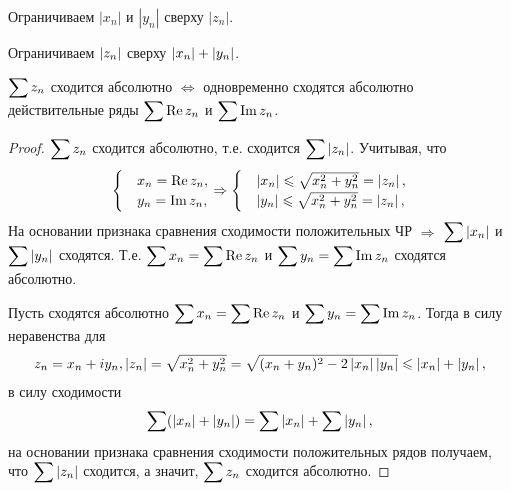\begin{plan}
\item \circled{$\Rightarrow$} Ограничиваем $|x_n|$ и $|y_n|$ сверху $|z_n|$.
\item \circled{$\Leftarrow$} Ограничиваем $\left\lvert z_n \right\rvert$ сверху $\left\lvert x_n \right\rvert + \left\lvert y_n \right\rvert$.
\end{plan}

\begin{col-answer-preambule}
\end{col-answer-preambule}
\begin{theorem}
  $\displaystyle\sum z_n$ сходится абсолютно $\Leftrightarrow$ одновременно сходятся абсолютно действительные ряды
$\displaystyle\sum \operatorname{Re}z_n$ и $\displaystyle\sum \operatorname{Im}z_n$.
\end{theorem}
\begin{proof}
  \circled{$\Rightarrow$} $\displaystyle\sum z_n$ сходится абсолютно, т.е. сходится $\displaystyle\sum \left\lvert z_n \right\rvert$. Учитывая,
  что
  \begin{align*}
    \begin{cases}
      &x_n = \operatorname{Re}z_n,\\
      &y_n = \operatorname{Im}z_n,\\
    \end{cases} \Rightarrow
    \begin{cases}
      &\left\lvert x_n \right\rvert \leqslant \sqrt{x_n^2 + y_n^2} = \left\lvert z_n \right\rvert,\\
      &\left\lvert y_n \right\rvert \leqslant \sqrt{x_n^2 + y_n^2} = \left\lvert z_n \right\rvert,\\
    \end{cases}
  \end{align*}
  На основании признака сравнения сходимости положительных ЧР $\Rightarrow$ $\displaystyle\sum\left\lvert x_n \right\rvert$ и $\displaystyle\sum\left\lvert y_n \right\rvert$
  сходятся. Т.е. ${\displaystyle\sum x_n = \displaystyle\sum \operatorname{Re}z_n}$ и
  ${\displaystyle\sum y_n = \displaystyle\sum \operatorname{Im}z_n}$
  сходятся абсолютно.

  \circled{$\Leftarrow$} Пусть сходятся абсолютно ${\displaystyle\sum x_n = \displaystyle\sum \operatorname{Re}z_n}$ и
  ${\displaystyle\sum y_n = \displaystyle\sum \operatorname{Im}z_n}$. Тогда в силу неравенства для
  \begin{align*}
    z_n = x_n + iy_n, \left\lvert z_n \right\rvert = \sqrt{x_n^2 + y_n^2} = \sqrt{(x_n + y_n)^2 - 2\left\lvert x_n \right\rvert\left\lvert y_n \right\rvert}
    \leqslant \left\lvert x_n \right\rvert + \left\lvert y_n \right\rvert,
  \end{align*}
  в силу сходимости
  \begin{align*}
    \sum(\left\lvert x_n \right\rvert + \left\lvert y_n \right\rvert) = \sum\left\lvert x_n \right\rvert + \sum\left\lvert y_n \right\rvert,
  \end{align*}
  на основании признака сравнения сходимости положительных рядов получаем, что $\displaystyle\sum\left\lvert z_n \right\rvert$
  сходится, а значит, $\displaystyle\sum z_n$ сходится абсолютно.
\end{proof}
